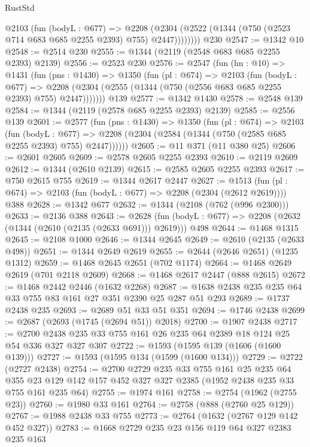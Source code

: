 \begin{lexlean}{RustStd}
\begin{coremodule}
          @2103
            (fun (bodyL : @677) =>
            @2208 (@2304 (@2522 (@1344 (@750 (@2523 @714 @683 @685 @2255 @2393) @755) @2447))))))))
    @230
@2547 := @1342 @10
@2548 := @2514 @230
@2555 := @1344 (@2119 (@2548 @683 @685 @2255 @2393) @2139)
@2556 := @2523 @230
@2576 := @2547
    (fun (hn : @10) =>
    @1431
      (fun (pns : @1430) =>
      @1350
        (fun (pl : @674) =>
        @2103
          (fun (bodyL : @677) =>
          @2208 (@2304 (@2555 (@1344 (@750 (@2556 @683 @685 @2255 @2393) @755) @2447)))))))
    @139
@2577 := @1342 @1430
@2578 := @2548 @139
@2584 := @1344 (@2119 (@2578 @685 @2255 @2393) @2139)
@2585 := @2556 @139
@2601 := @2577
    (fun (pns : @1430) =>
    @1350
      (fun (pl : @674) =>
      @2103
        (fun (bodyL : @677) =>
        @2208 (@2304 (@2584 (@1344 (@750 (@2585 @685 @2255 @2393) @755) @2447))))))
@2605 := @11 @371 (@11 @380 @25)
@2606 := @2601 @2605
@2609 := @2578 @2605 @2255 @2393
@2610 := @2119 @2609
@2612 := @1344 (@2610 @2139)
@2615 := @2585 @2605 @2255 @2393
@2617 := @750 @2615 @755
@2619 := @1344 @2617 @2447
@2627 := @1513 (fun (pl : @674) => @2103 (fun (bodyL : @677) => @2208 (@2304 (@2612 @2619)))) @388
@2628 := @1342 @677
@2632 := @1344 (@2108 (@762 (@996 @2300)))
@2633 := @2136 @388
@2643 := @2628 (fun (bodyL : @677) => @2208 (@2632 (@1344 (@2610 (@2135 (@2633 @691))) @2619))) @498
@2644 := @1468 @1315
@2645 := @2108 @1000
@2646 := @1344 @2645
@2649 := @2610 (@2135 (@2633 @498))
@2651 := @1344 @2649 @2619
@2655 := @2644 (@2646 @2651) (@1235 @1312)
@2659 := @1468 @2645 @2651 (@702 @1174)
@2664 := @1468 @2649 @2619 (@701 @2118 @2609)
@2668 := @1468 @2617 @2447 (@888 @2615)
@2672 := @1468 @2442 @2446 (@1632 @2268)
@2687 := @1638 @2438 @235 @235 @64 @33 @755 @83 @161 @27 @351 @2390 @25 @287 @51 @293
@2689 := @1737 @2438 @235
@2693 := @2689 @51 @33 @51 @351
@2694 := @1746 @2438
@2699 := @2687 (@2693 (@1745 (@2694 @51)) @2018)
@2700 := @1907 @2438
@2717 := @2700 @2438 @235 @33 @755 @161 @26 @235 @64 @2389 @18 @124 @25 @54 @336 @327 @327 @307
@2722 := @1593 (@1595 @139 (@1606 (@1600 @139)))
@2727 := @1593 (@1595 @134 (@1599 (@1600 @134)))
@2729 := @2722 (@2727 @2438)
@2754 := @2700
    @2729
    @235
    @33
    @755
    @161
    @25
    @235
    @64
    @355
    @23
    @129
    @142
    @157
    @452
    @327
    @327
    @2385
    (@1952 @2438 @235 @33 @755 @161 @235 @64)
@2755 := @1974 @161
@2758 := @2754 (@1962 (@2755 @23))
@2760 := @1980 @33 @161
@2764 := @2758 (@888 (@2760 @25 @129))
@2767 := @1988 @2438 @33 @755
@2773 := @2764 (@1632 (@2767 @129 @142 @452 @327))
@2783 := @1668 @2729 @235 @23 @156 @119 @64 @327 @2383 @235 @163

\end{coremodule}
\end{lexlean}
